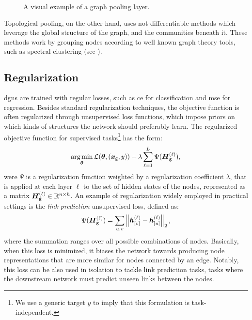 \begin{figure*}[h!]
    \centering
    \resizebox{.8\textwidth}{!}{}
    \caption{A visual example of a graph pooling layer.}
    \label{fig:pooling}
\end{figure*}
Topological pooling, on the other hand,  uses not-differentiable methods which leverage the global structure of the graph, and the communities beneath it. These methods work by grouping nodes according to well known graph theory tools, such as spectral clustering (see \eg \citet{vonluxburg2007tutorialspectralclustering, dhillon2007weightedgraphcuts}).

\subsection{Regularization}
\glspl{dgn} are trained with regular losses, such as \gls{ce} for classification and \gls{mse} for regression. Besides standard regularization techniques, the objective function is often regularized through unsupervised loss functions, which impose priors on which kinds of
structures the network should preferably learn. The regularized objective function for supervised tasks\footnote{We use a generic target $y$ to imply that this formulation is task-independent.} has the form:
$$\argmin_{\Param} \Loss(\Param, (\Vector{x}_{\Graph{g}}, y)) + \lambda \sum_{\ell=1}^L \Psi(\LayerStateMat{g}{\ell}),$$
were $\Psi$ is a regularization function weighted by a regularization coefficient $\lambda$, that is applied at each layer $\ell$ to the set of hidden states of the nodes, represented as a matrix $\Matrix{h}_{{\Graph{g}}}^{(\ell)} \in \Real^{n \times h}$. An example of regularization widely employed in practical settings is the \emph{link prediction} unsupervised loss, defined as:
\begin{align}
    \Psi(\LayerStateMat{g}{\ell}) = \sum_{u,v} \Norm{\StateVector{v}{\ell} - \StateVector{u}{\ell}}_2,
\end{align}
where the summation ranges over all possible combinations of nodes. Basically, when this loss is minimized, it biases the network towards producing node representations that are more similar for nodes connected by an edge. Notably, this loss can be also used in isolation to tackle link prediction tasks, \ie tasks where the downstream network must predict unseen links between the nodes.


